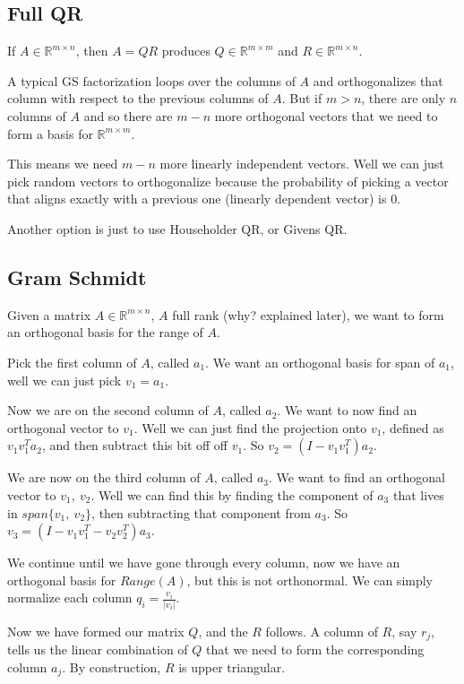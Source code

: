 \documentclass{article}
\theoremstyle{definition}
\begin{document}
\subsection{Full QR}
If $A \in \mathbb{R}^{m \times n}$, then $A = QR$ produces $Q \in \mathbb{R}^{m \times m}$ and $R \in \mathbb{R}^{m \times n}$.

A typical GS factorization loops over the columns of $A$ and orthogonalizes that column with respect to the previous columns of $A$. But if $m > n$, there are only $n$ columns of $A$ and so there are $m-n$ more orthogonal vectors that we need to form a basis for $\mathbb{R}^{m \times m}$.

This means we need $m-n$ more linearly independent vectors. Well we can just pick random vectors to orthogonalize because the probability of picking a vector that aligns exactly with a previous one (linearly dependent vector) is $0$.

Another option is just to use Householder QR, or Givens QR.

\subsection{Gram Schmidt}

Given a matrix $A \in \mathbb{R}^{m \times n}$, $A$ full rank (why? explained later), we want to form an orthogonal basis for the range of $A$.

Pick the first column of $A$, called $a_1$. We want an orthogonal basis for span of $a_1$, well we can just pick $v_1 = a_1$.

Now we are on the second column of $A$, called $a_2$. We want to now find an orthogonal vector to $v_1$. Well we can just find the projection onto $v_1$, defined as $v_1 v_1^T a_2$, and then subtract this bit off off $v_1$. So $v_2 = (I - v_1 v_1^T) a_2$.

We are now on the third column of $A$, called $a_3$. We want to find an orthogonal vector to $v_1,\ v_2$. Well we can find this by finding the component of $a_3$ that lives in $span\{v_1,\ v_2\}$, then subtracting that component from $a_3$. So $v_3 = (I - v_1 v_1^T - v_2 v_2^T) a_3$. 

We continue until we have gone through every column, now we have an orthogonal basis for $Range(A)$, but this is not orthonormal. We can simply normalize each column $q_i = \frac{v_i}{|v_i|}$.

Now we have formed our matrix $Q$, and the $R$ follows. A column of $R$, say $r_j$, tells us the linear combination of $Q$ that we need to form the corresponding column $a_j$. By construction, $R$ is upper triangular.
\end{document}

